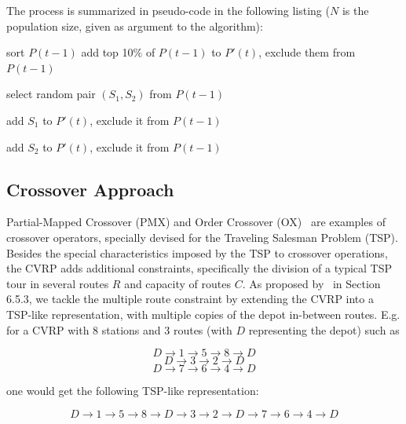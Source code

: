 The process is summarized in pseudo-code in the following listing ($N$ is the 
population size, given as argument to the algorithm):\vertbreak

\begin{algorithmic}[1]

\State sort $P(t - 1)$
\State add top 10\% of $P(t - 1)$ to $P'(t)$, 
\Statex[1] exclude them from $P(t - 1)$


    \Repeat
        \State select random pair $(S_1,S_2)$ from $P(t - 1)$


        \State add $S_1$ to $P'(t)$, exclude it from $P(t - 1)$


        \State add $S_2$ to $P'(t)$, exclude it from $P(t - 1)$

    \EndIf

\EndWhile

\end{algorithmic}\vertbreak

\subsection{Crossover Approach}
\label{subsec:cross-over}

Partial-Mapped Crossover (PMX) and Order Crossover (OX)~\cite{Toth2002} are 
examples of crossover operators, specially devised for the Traveling Salesman 
Problem (TSP). Besides the special characteristics imposed by the TSP to 
crossover operations, the CVRP adds 
additional constraints, specifically the division of a 
typical TSP tour in several routes $R$ and capacity of routes $C$. As proposed 
by~\cite{Toth2002} in Section 6.5.3, we tackle the multiple route constraint by 
extending the CVRP into a TSP-like representation, with multiple copies of the 
depot in-between routes. E.g. for a CVRP with 8 stations and 3 routes (with 
$D$ representing the depot) such as

\[ D \rightarrow 1 \rightarrow 5 \rightarrow 8 \rightarrow D \] 
\[ D \rightarrow 3 \rightarrow 2 \rightarrow D \] 
\[ D \rightarrow 7 \rightarrow 6 \rightarrow 4 \rightarrow D \] 

one would get the following TSP-like representation:

\[ D \rightarrow 1 \rightarrow 5 \rightarrow 8 \rightarrow D \rightarrow 3 \rightarrow 2 \rightarrow D \rightarrow 7 \rightarrow 6 \rightarrow 4 \rightarrow D \] 

